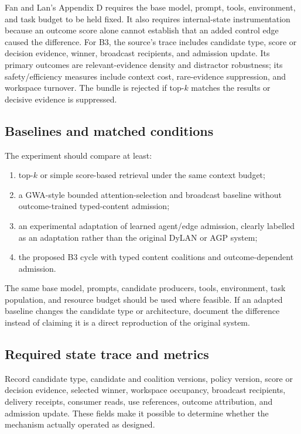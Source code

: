 Fan and Lan's Appendix D requires the base model, prompt, tools, environment, and task budget to be held fixed. It also requires internal-state instrumentation because an outcome score alone cannot establish that an added control edge caused the difference. For B3, the source's trace includes candidate type, score or decision evidence, winner, broadcast recipients, and admission update. Its primary outcomes are relevant-evidence density and distractor robustness; its safety/efficiency measures include context cost, rare-evidence suppression, and workspace turnover. The bundle is rejected if top-$k$ matches the results or decisive evidence is suppressed.

\subsection{Baselines and matched conditions}

The experiment should compare at least:
\begin{enumerate}
  \item top-$k$ or simple score-based retrieval under the same context budget;
  \item a GWA-style bounded attention-selection and broadcast baseline without outcome-trained typed-content admission;
  \item an experimental adaptation of learned agent/edge admission, clearly labelled as an adaptation rather than the original DyLAN or AGP system;
  \item the proposed B3 cycle with typed content coalitions and outcome-dependent admission.
\end{enumerate}

The same base model, prompts, candidate producers, tools, environment, task population, and resource budget should be used where feasible. If an adapted baseline changes the candidate type or architecture, document the difference instead of claiming it is a direct reproduction of the original system.

\subsection{Required state trace and metrics}

Record candidate type, candidate and coalition versions, policy version, score or decision evidence, selected winner, workspace occupancy, broadcast recipients, delivery receipts, consumer reads, use references, outcome attribution, and admission update. These fields make it possible to determine whether the mechanism actually operated as designed.

